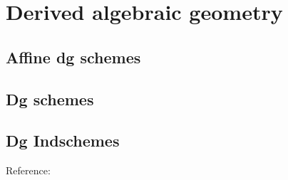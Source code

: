 \documentclass[english,no-theorem-numbers]{short-notes}
\begin{document}
\section{Derived algebraic geometry}

\subsection{Affine dg schemes}

\subsection{Dg schemes}

\subsection{Dg Indschemes}

Reference: \cite{GaitsgoryRozenblyum:arXiv:DGindschemes}

\printbibliography
\end{document}
